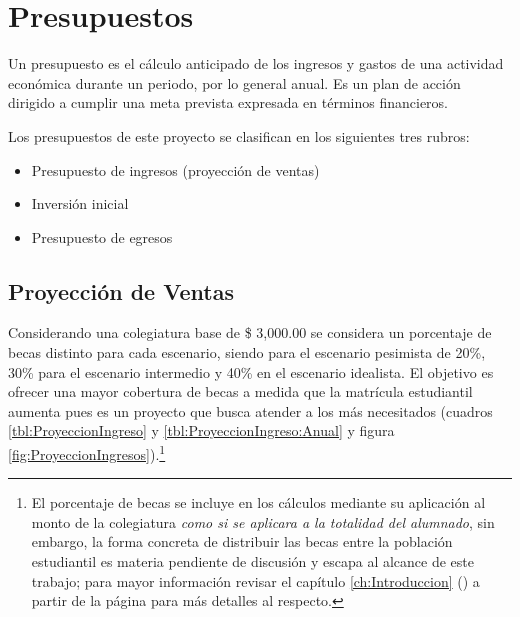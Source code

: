 





\clearpage
\section{Presupuestos}

Un presupuesto es el cálculo anticipado de los ingresos y gastos de una actividad económica durante un periodo, por lo general anual. Es un plan de acción dirigido a cumplir una meta prevista expresada en términos financieros.

Los presupuestos de este proyecto se clasifican en los siguientes tres rubros:

\begin{itemize}
	\item Presupuesto de ingresos (proyección de ventas)
	\item Inversión inicial
	\item Presupuesto de egresos
\end{itemize}

\subsection{Proyección de Ventas}

Considerando una colegiatura base de \$ 3,000.00 se considera un porcentaje de becas distinto para cada escenario, siendo para el escenario pesimista de 20\%, 30\% para el escenario intermedio y 40\% en el escenario idealista. El objetivo es ofrecer una mayor cobertura de becas a medida que la matrícula estudiantil aumenta pues es un proyecto que busca atender a los más necesitados (cuadros \ref{tbl:ProyeccionIngreso} y \ref{tbl:ProyeccionIngreso:Anual} y figura \ref{fig:ProyeccionIngresos}).\footnote{El porcentaje de becas se incluye en los cálculos mediante su aplicación al monto de la colegiatura \emph{como si se aplicara a la totalidad del alumnado}, sin embargo, la forma concreta de distribuir las becas entre la población estudiantil es materia pendiente de discusión y escapa al alcance de este trabajo; para mayor información revisar el capítulo \ref{ch:Introduccion} () a partir de la página \pageref{ch:Introduccion} para más detalles al respecto.}





